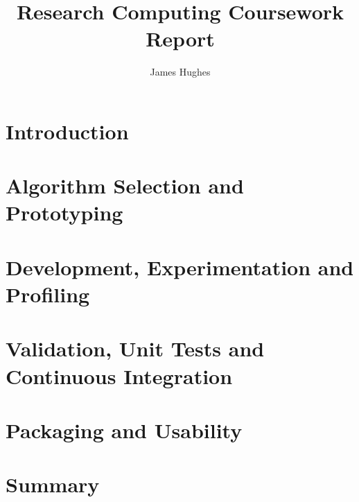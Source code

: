 \documentclass[12pt]{article}
\title{Research Computing Coursework Report}
\author{James Hughes}
\begin{document}
\maketitle
\newpage


\section*{Introduction}
\section*{Algorithm Selection and Prototyping}
\section*{Development, Experimentation and Profiling}
\section*{Validation, Unit Tests and Continuous Integration}
\section*{Packaging and Usability}
\section*{Summary}
\end{document}
